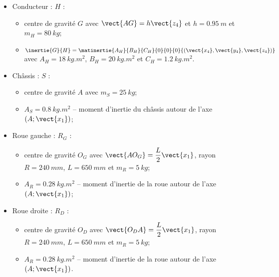 \begin{itemize}
\item Conducteur : $H$ : 
\begin{itemize}
\item centre de gravité $G$ avec $\vect{AG}=h\vect{z_4}$ et $h=\SI{0,95}{m}$ et $m_H = \SI{80}{kg}$;
\item $\inertie{G}{H} = \matinertie{A_H}{B_H}{C_H}{0}{0}{0}{\left(\vect{x_4},\vect{y_4},\vect{z_4}\right)}$ avec $A_H =\SI{18}{kg.m^2}$, $B_H =\SI{20}{kg.m^2}$ et $C_H =\SI{1,2}{kg.m^2}$.
\end{itemize}
\item Châssis : $S$ : 
\begin{itemize}
\item centre de gravité $A$ avec $m_S = \SI{25}{kg}$;
\item $A_S =\SI{0,8}{kg.m^2}$ -- moment d'inertie du châssis autour de l'axe $\left(A;\vect{x_1} \right)$; %
\end{itemize}
\item Roue gauche : $R_G$ : 
\begin{itemize}
\item centre de gravité $O_G$ avec $\vect{AO_G}=\dfrac{L}{2}\vect{x_1}$, rayon $R=\SI{240}{mm}$, $L=\SI{650}{mm}$ et $m_R = \SI{5}{kg}$;
\item $A_R =\SI{0,28}{kg.m^2}$ -- moment d'inertie de la roue autour de l'axe $\left(A;\vect{x_1} \right)$; %
\end{itemize}
\item Roue droite : $R_D$ : 
\begin{itemize}
\item centre de gravité $O_D$ avec $\vect{O_DA}=\dfrac{L}{2}\vect{x_1}$, rayon $R=\SI{240}{mm}$, $L=\SI{650}{mm}$ et $m_R = \SI{5}{kg}$;
\item $A_R =\SI{0,28}{kg.m^2}$ -- moment d'inertie de la roue autour de l'axe $\left(A;\vect{x_1} \right)$. %
\end{itemize}
\end{itemize}


